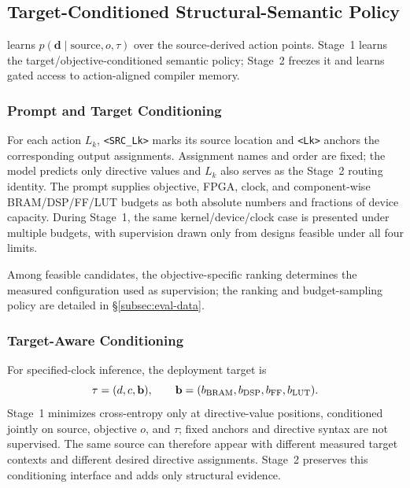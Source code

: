 \subsection{Target-Conditioned Structural-Semantic Policy}
\label{subsec:llm-backbone}

\framework learns $p(\mathbf d\mid\text{source},o,\tau)$ over the source-derived action points. Stage~1 learns the target/objective-conditioned semantic policy; 
Stage~2 freezes it and learns gated access to action-aligned compiler memory.


\subsubsection{Prompt and Target Conditioning}
\label{subsubsec:prompt}

For each action $L_k$, \texttt{<SRC\_Lk>} marks its source location and \texttt{<Lk>} anchors the corresponding output assignments.
Assignment names and order are fixed; the model predicts only directive values and $L_k$ also serves as the Stage~2 routing identity.
The prompt supplies objective, FPGA, clock, and component-wise BRAM/DSP/FF/LUT budgets as both absolute numbers and fractions of device capacity. 
During Stage~1, the same kernel/device/clock case is presented under multiple budgets, with supervision drawn only from designs feasible under all four limits.

Among feasible candidates, the objective-specific ranking determines the measured configuration used as supervision; 
the ranking and budget-sampling policy are detailed in \S\ref{subsec:eval-data}.



\subsubsection{Target-Aware Conditioning}
\label{subsubsec:target-conditioning}

For specified-clock inference, the deployment target is
\[
\tau=(d,c,\mathbf b),\qquad
\mathbf b=(b_{\rm BRAM},b_{\rm DSP},b_{\rm FF},b_{\rm LUT}).
\]
Stage~1 minimizes cross-entropy only at directive-value positions, conditioned jointly on source, objective $o$, and $\tau$; fixed anchors and directive syntax are not supervised. 
The same source can therefore appear with different measured target contexts and different desired directive assignments. 
Stage~2 preserves this conditioning interface and adds only structural evidence. 

